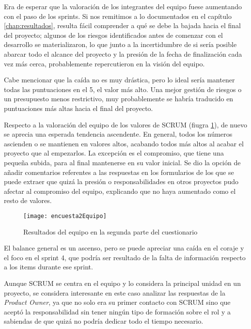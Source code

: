 Era de esperar que la valoración de los integrantes del equipo fuese aumentando con el paso de los sprints. Si nos remitimos a lo documentados en el capítulo \ref{chap:resultados}, resulta fácil comprender a qué se debe la bajada hacia el final del proyecto; algunos de los riesgos identificados antes de comenzar con el desarrollo se materializaron, lo que junto a la incertidumbre de si sería posible abarcar todo el alcance del proyecto y la presión de la fecha de finalización cada vez más cerca, probablemente repercutieron en la visión del equipo. 

Cabe mencionar que la caída no es muy drástica, pero lo ideal sería mantener todas las puntuaciones en el 5, el valor más alto. Una mejor gestión de riesgos o un presupuesto menos restrictivo, muy probablemente se habría traducido en puntuaciones más altas hacia el final del proyecto.

Respecto a la valoración del equipo de los valores de SCRUM (fiugra \ref{fig:encuesta2Equipo}), de nuevo se aprecia una esperada tendencia ascendente. En general, todos los números ascienden o se mantienen en valores altos, acabando todos más altos al acabar el proyecto que al empezarlos. La excepción es el compromiso, que tiene una pequeña subida, para al final mantenerse en su valor inicial. Se dio la opción de añadir comentarios referentes a las respuestas en los formularios de los que se puede extraer que quizá la presión o responsabilidades en otros proyectos pudo afectar al compromiso del equipo, explicando que no haya aumentado como el resto de valores.

\begin{figure}[!h]
\begin{center}
\texttt{[image: encuesta2Equipo]}
\caption{Resultados del equipo en la segunda parte del cuestionario}
\label{fig:encuesta2Equipo}
\end{center}
\end{figure}
\clearpage
El balance general es un ascenso, pero se puede apreciar una caída en el coraje y el foco en el sprint 4, que podría ser resultado de la falta de información respecto a los items durante ese sprint. 

Aunque SCRUM se centra en el equipo y lo considera la principal unidad en un proyecto, se considera interesante en este caso analizar las respuestas de la \emph{Product Owner}, ya que no solo era su primer contacto con SCRUM sino que aceptó la responsabilidad sin tener ningún tipo de formación sobre el rol y a sabiendas de que quizá no podría dedicar todo el tiempo necesario.

